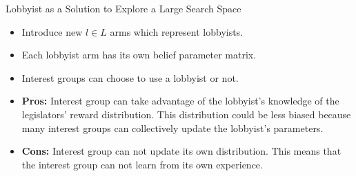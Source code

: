 \documentclass{beamer}
\begin{document}

	\begin{frame}{\large{Lobbyist as a Solution to Explore a Large Search Space}}
		\begin{itemize}
			\item Introduce new $l \in L$ arms which represent lobbyists.
			\item Each lobbyist arm has its own belief parameter matrix.
			\item Interest groups can choose to use a lobbyist or not.
 					\item \textbf{Pros:} Interest group can take advantage of the lobbyist's knowledge of the legislators' reward distribution. This distribution could be less biased because many interest groups can collectively update the lobbyist's parameters.
			\item \textbf{Cons:} Interest group can not update its own distribution. This means that the interest group can not learn from its own experience.

		\end{itemize}
	\end{frame}
\end{document}
